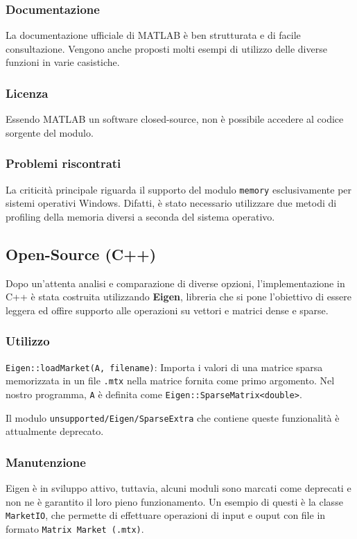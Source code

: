 \documentclass[11pt,italian]{article}
\begin{document}
\subsubsection*{Documentazione}
La documentazione ufficiale di MATLAB è ben strutturata e di facile consultazione. Vengono anche proposti molti esempi di utilizzo delle diverse funzioni in varie casistiche.

\subsubsection*{Licenza}
Essendo MATLAB un software closed-source, non è possibile accedere al codice sorgente del modulo.

\subsubsection*{Problemi riscontrati}
La criticità principale riguarda il supporto del modulo \lstinline{memory} esclusivamente per sistemi operativi Windows. Difatti, è stato necessario utilizzare due metodi di profiling della memoria diversi a seconda del sistema operativo.

\subsection{Open-Source (C++)}
Dopo un'attenta analisi e comparazione di diverse opzioni, l'implementazione in C++ è stata costruita utilizzando \textbf{Eigen},  libreria che si pone l'obiettivo di essere leggera ed offire supporto alle operazioni su vettori e matrici dense e sparse.

\subsubsection*{Utilizzo}
\lstinline{Eigen::loadMarket(A, filename)}: Importa i valori di una matrice sparsa memorizzata in un file \lstinline{.mtx} nella matrice fornita come primo argomento. Nel nostro programma, \lstinline{A} è definita come \lstinline{Eigen::SparseMatrix<double>}.

Il modulo \lstinline{unsupported/Eigen/SparseExtra} che contiene queste funzionalità è attualmente deprecato.

\subsubsection*{Manutenzione}
Eigen è in sviluppo attivo, tuttavia, alcuni moduli sono marcati come deprecati e non ne è garantito il loro pieno funzionamento. Un esempio di questi è la classe \lstinline{MarketIO}, che permette di effettuare operazioni di input e ouput con file in formato \lstinline{Matrix Market (.mtx)}.
\end{document}
